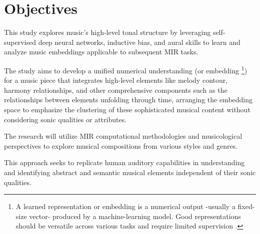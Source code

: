 \section{Objectives}

This study explores music's high-level tonal structure by leveraging self-supervised deep neural networks, inductive bias, and aural skills to learn and analyze music embeddings applicable to subsequent MIR tasks. 

The study aims to develop a unified numerical understanding (or embedding \footnote{A learned representation or embedding is a numerical output -usually a fixed-size vector- produced by a machine-learning model. Good representations should be versatile across various tasks and require limited supervision \cite{Turian2022HEAR:Representations}.}) for a music piece that integrates high-level elements like melody contour, harmony relationships, and other comprehensive components such as the relationships between elements unfolding through time, arranging the embedding space to emphasize the clustering of these sophisticated musical content without considering sonic qualities or attributes. 

The research will utilize MIR computational methodologies and musicological perspectives to explore musical compositions from various styles and genres. 

This approach seeks to replicate human auditory capabilities in understanding and identifying abstract and semantic musical elements independent of their sonic qualities.